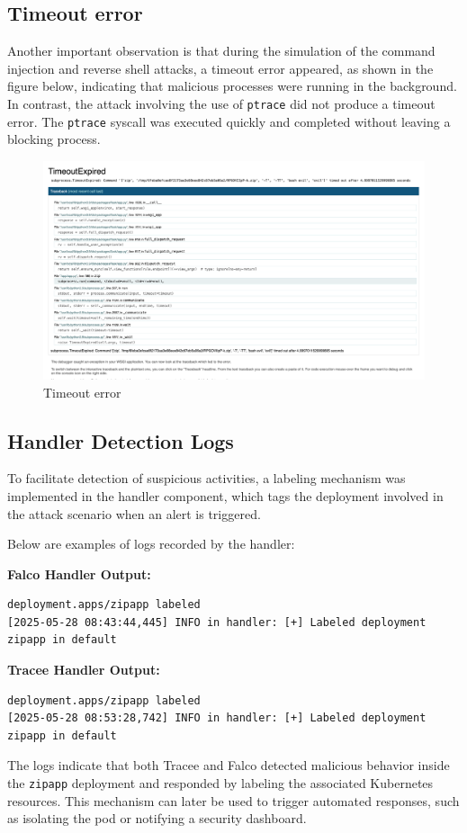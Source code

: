 \subsection{Timeout error}
Another important observation is that during the simulation of the command injection and reverse shell attacks, a timeout error appeared, as shown in the figure below, indicating that malicious processes were running in the background. 
In contrast, the attack involving the use of \texttt{ptrace} did not produce a timeout error. The \texttt{ptrace} syscall was executed quickly and completed without leaving a blocking process. 

\begin{figure}[h!]
    \centering
    \includegraphics[width=0.5\linewidth]{images/timeout.png}
    \caption{Timeout error}
    \label{fig:timeout}
\end{figure}
\subsection{Handler Detection Logs}
To facilitate detection of suspicious activities, a labeling mechanism was implemented in the handler component, which tags the deployment involved in the attack scenario when an alert is triggered.

\noindent Below are examples of logs recorded by the handler:

\noindent \textbf{Falco Handler Output:}
\begin{verbatim}
deployment.apps/zipapp labeled
[2025-05-28 08:43:44,445] INFO in handler: [+] Labeled deployment zipapp in default
\end{verbatim}

\noindent \textbf{Tracee Handler Output:}
\begin{verbatim}
deployment.apps/zipapp labeled
[2025-05-28 08:53:28,742] INFO in handler: [+] Labeled deployment zipapp in default
\end{verbatim}

The logs indicate that both Tracee and Falco detected malicious behavior inside the \texttt{zipapp} deployment and responded by labeling the associated Kubernetes resources. This mechanism can later be used to trigger automated responses, such as isolating the pod or notifying a security dashboard.

